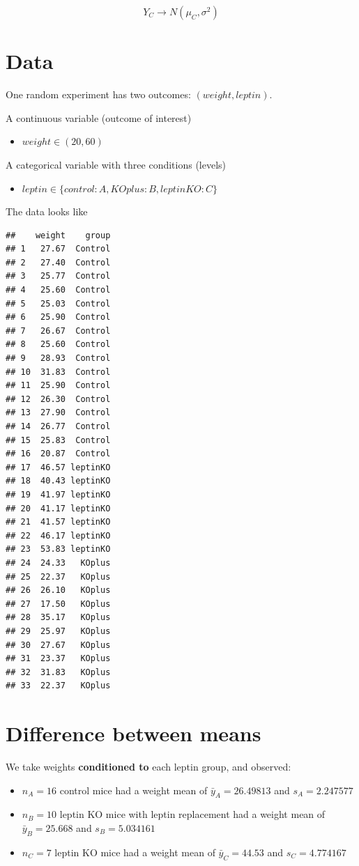 \documentclass[
]{book}
\providecommand{\tightlist}{%
  \setlength{\itemsep}{0pt}\setlength{\parskip}{0pt}}
\begin{document}
\[Y_C \rightarrow N(\mu_C, \sigma^2)\]

\hypertarget{data-3}{%
\section{Data}\label{data-3}}

One random experiment has two outcomes: \((weight, leptin)\).

A continuous variable (outcome of interest)

\begin{itemize}
\tightlist
\item
  \(weight \in (20, 60)\)
\end{itemize}

A categorical variable with three conditions (levels)

\begin{itemize}
\tightlist
\item
  \(leptin \in \{control:A,KOplus:B, leptinKO:C\}\)
\end{itemize}

The data looks like

\begin{verbatim}
##    weight    group
## 1   27.67  Control
## 2   27.40  Control
## 3   25.77  Control
## 4   25.60  Control
## 5   25.03  Control
## 6   25.90  Control
## 7   26.67  Control
## 8   25.60  Control
## 9   28.93  Control
## 10  31.83  Control
## 11  25.90  Control
## 12  26.30  Control
## 13  27.90  Control
## 14  26.77  Control
## 15  25.83  Control
## 16  20.87  Control
## 17  46.57 leptinKO
## 18  40.43 leptinKO
## 19  41.97 leptinKO
## 20  41.17 leptinKO
## 21  41.57 leptinKO
## 22  46.17 leptinKO
## 23  53.83 leptinKO
## 24  24.33   KOplus
## 25  22.37   KOplus
## 26  26.10   KOplus
## 27  17.50   KOplus
## 28  35.17   KOplus
## 29  25.97   KOplus
## 30  27.67   KOplus
## 31  23.37   KOplus
## 32  31.83   KOplus
## 33  22.37   KOplus
\end{verbatim}

\hypertarget{difference-between-means-2}{%
\section{Difference between means}\label{difference-between-means-2}}

We take weights \textbf{conditioned to} each leptin group, and observed:

\begin{itemize}
\item
  \(n_A=16\) control mice had a weight mean of \(\bar{y}_A=26.49813\) and \(s_A=2.247577\)
\item
  \(n_B=10\) leptin KO mice with leptin replacement had a weight mean of \(\bar{y}_B=25.668\) and \(s_B=5.034161\)
\item
  \(n_C=7\) leptin KO mice had a weight mean of \(\bar{y}_C=44.53\) and \(s_C=4.774167\)
\end{itemize}
\end{document}

